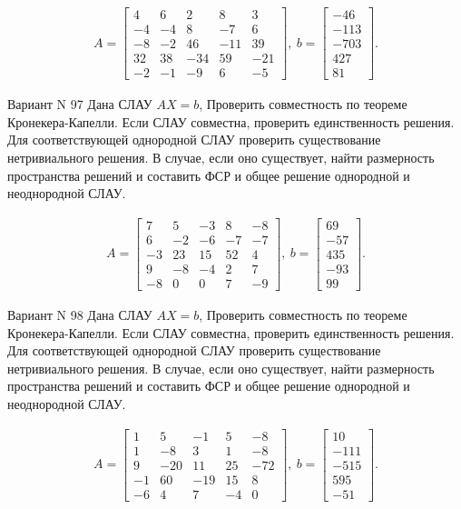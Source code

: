 \documentclass[11pt]{report}
\begin{document}
\begin{align*}
 A = \left[\begin{matrix}4 & 6 & 2 & 8 & 3\\-4 & -4 & 8 & -7 & 6\\-8 & -2 & 46 & -11 & 39\\32 & 38 & -34 & 59 & -21\\-2 & -1 & -9 & 6 & -5\end{matrix}\right],
\ b = \left[\begin{matrix}-46\\-113\\-703\\427\\81\end{matrix}\right]. 
 \end{align*}

Вариант N 97
Дана СЛАУ $AX = b$,
Проверить совместность по теореме Кронекера-Капелли. Если СЛАУ совместна, проверить единственность решения.
Для соответствующей однородной СЛАУ проверить существование нетривиального решения. В случае, если оно существует,
найти размерность пространства решений и составить ФСР и общее решение однородной  и неоднородной СЛАУ.


\begin{align*}
 A = \left[\begin{matrix}7 & 5 & -3 & 8 & -8\\6 & -2 & -6 & -7 & -7\\-3 & 23 & 15 & 52 & 4\\9 & -8 & -4 & 2 & 7\\-8 & 0 & 0 & 7 & -9\end{matrix}\right],
\ b = \left[\begin{matrix}69\\-57\\435\\-93\\99\end{matrix}\right]. 
 \end{align*}

Вариант N 98
Дана СЛАУ $AX = b$,
Проверить совместность по теореме Кронекера-Капелли. Если СЛАУ совместна, проверить единственность решения.
Для соответствующей однородной СЛАУ проверить существование нетривиального решения. В случае, если оно существует,
найти размерность пространства решений и составить ФСР и общее решение однородной  и неоднородной СЛАУ.


\begin{align*}
 A = \left[\begin{matrix}1 & 5 & -1 & 5 & -8\\1 & -8 & 3 & 1 & -8\\9 & -20 & 11 & 25 & -72\\-1 & 60 & -19 & 15 & 8\\-6 & 4 & 7 & -4 & 0\end{matrix}\right],
\ b = \left[\begin{matrix}10\\-111\\-515\\595\\-51\end{matrix}\right]. 
 \end{align*}
\end{document}
